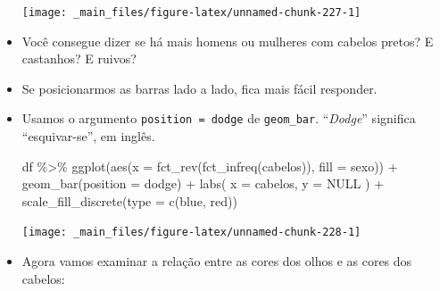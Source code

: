 \documentclass[
  11pt]{report}
\newenvironment{Shaded}{\begin{snugshade}}{\end{snugshade}}
\newcommand{\AttributeTok}[1]{\textcolor[rgb]{0.77,0.63,0.00}{#1}}
\newcommand{\ConstantTok}[1]{\textcolor[rgb]{0.00,0.00,0.00}{#1}}
\newcommand{\FunctionTok}[1]{\textcolor[rgb]{0.00,0.00,0.00}{#1}}
\newcommand{\NormalTok}[1]{#1}
\newcommand{\SpecialCharTok}[1]{\textcolor[rgb]{0.00,0.00,0.00}{#1}}
\newcommand{\StringTok}[1]{\textcolor[rgb]{0.31,0.60,0.02}{#1}}
\renewenvironment{Shaded}{
    \begin{mdframed}[%
      roundcorner=2pt,%
      innerleftmargin=5pt,%
      innerrightmargin=5pt,%
      topline=true,%
      leftline=true,%
      rightline=true,%
      bottomline=true,%
      linewidth=0.5pt,%
      linecolor=black!20,%
      backgroundcolor=black!2,%
      skipabove=2ex,%
      skipbelow=2.5ex%
    ]%
  }
  {
    \end{mdframed}
  }
\begin{document}
\begin{itemize}
  \begin{center}\texttt{[image: \_main\_files/figure-latex/unnamed-chunk-227-1]} \end{center}
\item
  Você consegue dizer se há mais homens ou mulheres com cabelos pretos? E castanhos? E ruivos?
\item
  Se posicionarmos as barras lado a lado, fica mais fácil responder.
\item
  Usamos o argumento \texttt{position\ =\ \textquotesingle{}dodge\textquotesingle{}} de \texttt{geom\_bar}. ``\emph{Dodge}'' significa ``esquivar-se'', em inglês.

\begin{Shaded}
\begin{Highlighting}[]
\NormalTok{df }\SpecialCharTok{\%\textgreater{}\%} 
  \FunctionTok{ggplot}\NormalTok{(}\FunctionTok{aes}\NormalTok{(}\AttributeTok{x =} \FunctionTok{fct\_rev}\NormalTok{(}\FunctionTok{fct\_infreq}\NormalTok{(cabelos)), }\AttributeTok{fill =}\NormalTok{ sexo)) }\SpecialCharTok{+}
    \FunctionTok{geom\_bar}\NormalTok{(}\AttributeTok{position =} \StringTok{\textquotesingle{}dodge\textquotesingle{}}\NormalTok{) }\SpecialCharTok{+}
    \FunctionTok{labs}\NormalTok{(}
      \AttributeTok{x =} \StringTok{\textquotesingle{}cabelos\textquotesingle{}}\NormalTok{,}
      \AttributeTok{y =} \ConstantTok{NULL}
\NormalTok{    ) }\SpecialCharTok{+}
    \FunctionTok{scale\_fill\_discrete}\NormalTok{(}\AttributeTok{type =} \FunctionTok{c}\NormalTok{(}\StringTok{\textquotesingle{}blue\textquotesingle{}}\NormalTok{, }\StringTok{\textquotesingle{}red\textquotesingle{}}\NormalTok{))}
\end{Highlighting}
\end{Shaded}

  \begin{center}\texttt{[image: \_main\_files/figure-latex/unnamed-chunk-228-1]} \end{center}
\item
  Agora vamos examinar a relação entre as cores dos olhos e as cores dos cabelos:


\end{itemize}
\end{document}
